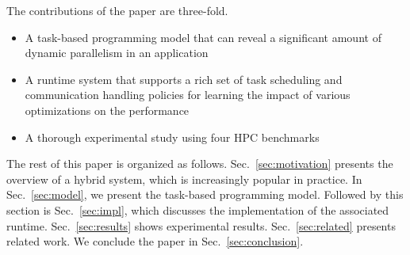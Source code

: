 The contributions of the paper are three-fold.
\begin{itemize}
\item A task-based programming model that can reveal a significant amount of dynamic parallelism in an application
\item A runtime system that supports a rich set of task scheduling and communication handling policies for learning the impact of various optimizations on the performance
\item A thorough experimental study using four HPC benchmarks 
\end{itemize}

The rest of this paper is organized as follows.
Sec.~\ref{sec:motivation} presents the overview of a hybrid system, which is increasingly popular in practice.
In Sec.~\ref{sec:model}, we present the task-based programming model.
Followed by this section is Sec.~\ref{sec:impl}, which discusses the implementation of the associated runtime.
Sec.~\ref{sec:results} shows experimental results.
Sec.~\ref{sec:related} presents related work.
We conclude the paper in Sec.~\ref{sec:conclusion}.
